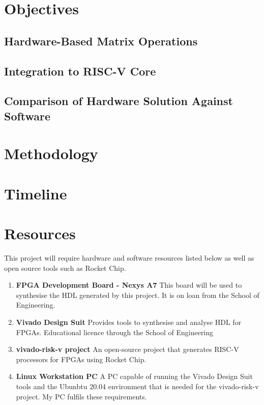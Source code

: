 \documentclass[a4paper,fleqn,12pt]{article}
\begin{document}
	\section{Objectives}
	\subsection{Hardware-Based Matrix Operations}
	\subsection{Integration to RISC-V Core}
	\subsection{Comparison of Hardware Solution Against Software}
	
	\section{Methodology}
	
	\section{Timeline}
	
	\section{Resources}
	This project will require hardware and software resources listed below as well as open source tools such as Rocket Chip.
	\begin{enumerate}
		\item \textbf{FPGA Development Board - Nexys A7} \newline
		This board will be used to synthesise the HDL generated by this project. It is on loan from the School of Engineering.
		\item \textbf{Vivado Design Suit} \newline
		Provides tools to synthesise and analyse HDL for FPGAs. Educational licence through the School of Engineering
		\item \textbf{vivado-risk-v project} \citep{vivado-risk-v} \newline
		An open-source project that generates RISC-V processors for FPGAs using Rocket Chip.
		\item \textbf{Linux Workstation PC} \newline
		A PC capable of running the Vivado Design Suit tools and the Ubunbtu 20.04 environment that is needed for the vivado-risk-v project. My PC fulfils these requirements.
	\end{enumerate}
	
\end{document}
